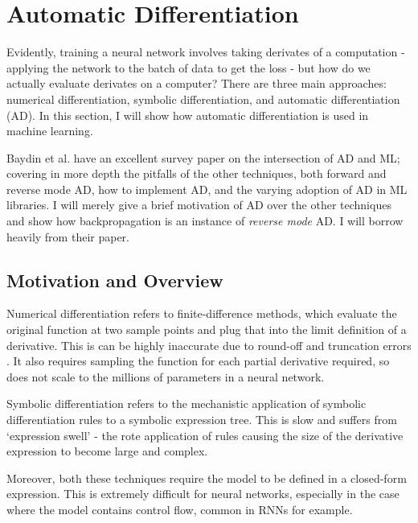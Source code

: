 \section{Automatic Differentiation}
Evidently, training a neural network involves taking derivates of a computation - applying the network to the batch of data to get the loss -
but how do we actually evaluate derivates on a computer?
There are three main approaches: numerical differentiation, symbolic differentiation, and automatic differentiation (AD).
In this section, I will show how automatic differentiation is used in machine learning.

Baydin et al. \cite{Baydin2015} have an excellent survey paper on the intersection of AD and ML;
covering in more depth the pitfalls of the other techniques, both forward and reverse mode AD, how to implement AD, and the varying adoption of AD in ML libraries.
I will merely give a brief motivation of AD over the other techniques and show how backpropagation is an instance of \textit{reverse mode} AD.
I will borrow heavily from their paper.

\subsection{Motivation and Overview}
Numerical differentiation refers to finite-difference methods, which evaluate the original function at two sample points and plug that into the limit definition of a derivative.
This is can be highly inaccurate due to round-off and truncation errors \cite{Jerrell1997}.
It also requires sampling the function for each partial derivative required, so does not scale to the millions of parameters in a neural network.

Symbolic differentiation refers to the mechanistic application of symbolic differentiation rules to a symbolic expression tree.
This is slow and suffers from `expression swell' \cite{Juedes1991} - the rote application of rules causing the size of the derivative expression to become large and complex.

Moreover, both these techniques require the model to be defined in a closed-form expression.
This is extremely difficult for neural networks, especially in the case where the model contains control flow, common in RNNs for example.

